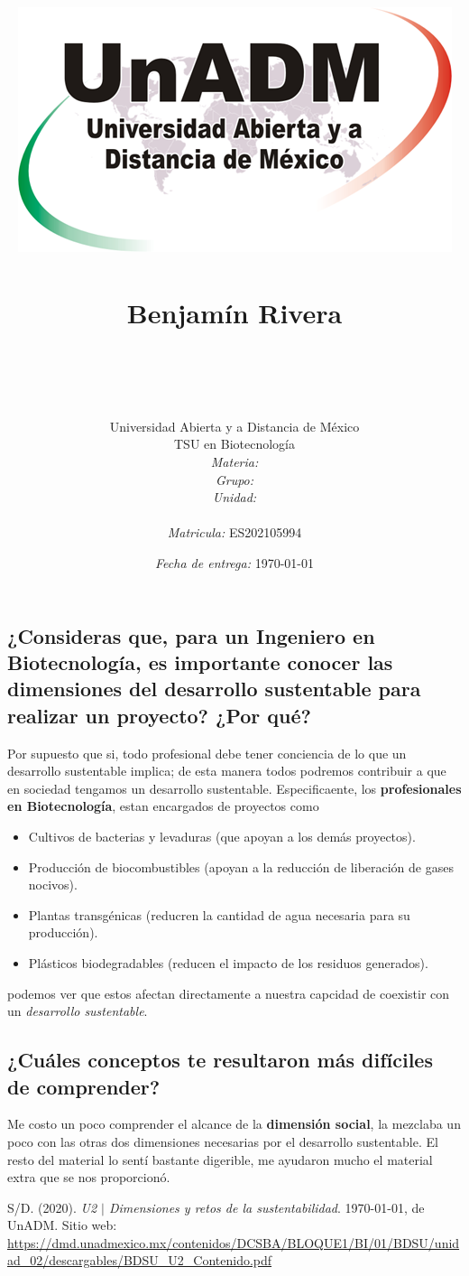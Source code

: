 \documentclass[12pt]{article}
\title{
	\includegraphics{../../../assets/logo-unadm} \\
	\ \\ Benjam\'in Rivera \\
	\bf{\titulo}\\\ \\}
\author{
	Universidad Abierta y a Distancia de México \\
	TSU en Biotecnolog\'ia \\
	\textit{Materia:} \materia \\
	\textit{Grupo:} \grupo \\
	\textit{Unidad:} \unidad \\
	\\
	\textit{Matricula:} ES202105994 }
\date{\textit{Fecha de entrega:} \today}
\begin{document}
\maketitle\newpage

\subsection*{¿Consideras que, para un Ingeniero en Biotecnología, es importante conocer las dimensiones del desarrollo sustentable para realizar un proyecto? ¿Por qué?}
	
	\par Por supuesto que si, todo profesional debe tener conciencia de lo que un desarrollo sustentable implica; de esta manera todos podremos contribuir a que en sociedad tengamos un desarrollo sustentable. Especificaente, los \textbf{profesionales en Biotecnología}, estan encargados de proyectos como

\begin{itemize}
	\item Cultivos de bacterias y levaduras (que apoyan a los demás proyectos).
	\item Producción de biocombustibles (apoyan a la reducción de liberación de gases nocivos).
 	\item Plantas transgénicas (reducren la cantidad de agua necesaria para su producción).
	\item Plásticos biodegradables (reducen el impacto de los residuos generados). 
\end{itemize}
podemos ver que estos afectan directamente a nuestra capcidad de coexistir con un \textit{desarrollo sustentable}.
	
	
\subsection*{¿Cuáles conceptos te resultaron más difíciles de comprender?}
	
	\par Me costo un poco comprender el alcance de la \textbf{dimensión social}, la mezclaba un poco con las otras dos dimensiones necesarias por el desarrollo sustentable. El resto del material lo sent\'i bastante digerible, me ayudaron mucho el material extra que se nos proporcionó.
	
	
	\begin{thebibliography}{X}
		
		 S/D. (2020). \textit{U2 $|$ Dimensiones y retos de la sustentabilidad}. \today, de UnADM. Sitio web: \url{https://dmd.unadmexico.mx/contenidos/DCSBA/BLOQUE1/BI/01/BDSU/unidad_02/descargables/BDSU_U2_Contenido.pdf} 

	\end{thebibliography}
\end{document}
